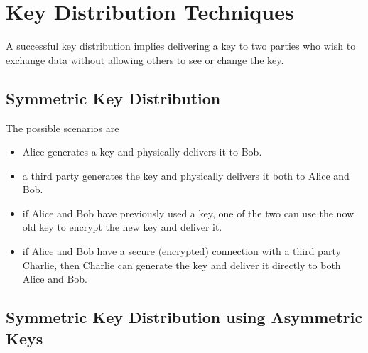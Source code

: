 \documentclass[oneside]{academica}
\begin{document}
\section{Key Distribution Techniques}

A successful key distribution implies delivering a key to two parties who wish to exchange data without allowing others to see or change the key.

\subsection{Symmetric Key Distribution}

The possible scenarios are
\begin{itemize}
  \item Alice generates a key and physically delivers it to Bob.
  \item a third party generates the key and physically delivers it both to Alice and Bob.
  \item if Alice and Bob have previously used a key, one of the two can use the now old key to encrypt the new key and deliver it.
  \item if Alice and Bob have a secure (encrypted) connection with a third party Charlie, then Charlie can generate the key and deliver it directly to both Alice and Bob.
\end{itemize}

\subsection{Symmetric Key Distribution using Asymmetric Keys}\label{sym_key_dist_with_asym_key}
\end{document}
